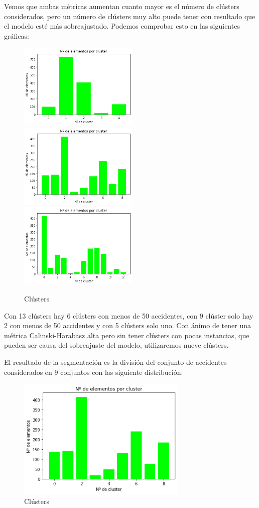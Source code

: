 \documentclass[a4]{article}
\begin{document}
Vemos que ambas métricas aumentan cuanto mayor es el número de clústers considerados, pero un número de clústers muy alto puede tener con resultado que el modelo esté más sobreajustado. Podemos comprobar esto en las siguientes gráficas:

\begin{figure}[H]
  \centering
  \caption{Clústers}
  \includegraphics[width=57mm]{imagenes/c2_kmeans_clusters_5}
  \includegraphics[width=57mm]{imagenes/c2_kmeans_clusters}
  \includegraphics[width=57mm]{imagenes/c2_kmeans_clusters_13}
\end{figure}

Con 13 clústers hay 6 clústers con menos de 50 accidentes, con 9 clúster solo hay 2 con menos de 50 accidentes y con 5 clústers solo uno. Con ánimo de tener una métrica Calinski-Harabasz alta pero sin tener clústers con pocas instancias, que pueden ser causa del sobreajuste del modelo, utilizaremos nueve clústers.

El resultado de la segmentación es la división del conjunto de accidentes considerados en 9 conjuntos con las siguiente distribución:

\begin{figure}[H]
  \centering
  \caption{Clústers}
  \includegraphics[width=81mm]{imagenes/c2_kmeans_clusters}
\end{figure}
\end{document}
